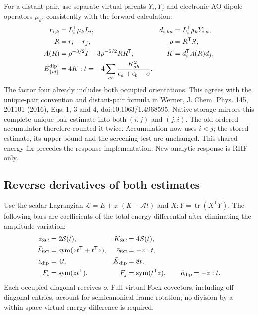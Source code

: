 \documentclass[11pt]{article}
\begin{document}
For a distant pair, use separate virtual parents $Y_i,Y_j$ and electronic
AO dipole operators $\mu_k$, consistently with the forward calculation:
\begin{align}
 r_{i,k}&=L_i^{\mathsf T}\mu_k L_i,&
 d_{i,ka}&=L_i^{\mathsf T}\mu_k Y_{i,a},\\
 R&=r_i-r_j,& \rho&=R^{\mathsf T}R,\\
 A(R)&=\rho^{-3/2}I-3\rho^{-5/2}RR^{\mathsf T},&
 K&=d_i^{\mathsf T}A(R)d_j,\\
 E_{\{ij\}}^{\rm dip}&=4K:t
 =-4\sum_{ab}\frac{K_{ab}^2}{\epsilon_a+\epsilon_b-o}.&&
 \label{eq:unique-dipole-energy}
\end{align}
The factor four already includes both occupied orientations. This agrees
with the unique-pair convention and distant-pair formula in Werner,
J. Chem. Phys. 145, 201101 (2016), Eqs. 1, 3 and 4,
doi:10.1063/1.4968595. Native storage mirrors this complete unique-pair
estimate into both $(i,j)$ and $(j,i)$. The old ordered accumulator therefore
counted it twice. Accumulation now uses $i<j$; the stored estimate, its
upper bound and the screening test are unchanged. This shared energy fix
precedes the response implementation. New analytic response is RHF only.

\subsection{Reverse derivatives of both estimates}
Use the scalar Lagrangian $\mathcal L=E+z:(K-\mathcal A t)$ and
$X:Y=\operatorname{tr}(X^{\mathsf T}Y)$. The following bars are coefficients
of the total energy differential after eliminating the amplitude variation:
\begin{align}
 z_{\rm SC}&=2\mathcal S(t),&\bar K_{\rm SC}&=4\mathcal S(t),\\
 \bar F_{\rm SC}&=\operatorname{sym}(zt^{\mathsf T}+t^{\mathsf T}z),&
 \bar o_{\rm SC}&=-z:t,\\
 z_{\rm dip}&=4t,&\bar K_{\rm dip}&=8t,\\
 \bar F_i&=\operatorname{sym}(zt^{\mathsf T}),&
 \bar F_j&=\operatorname{sym}(t^{\mathsf T}z),\qquad \bar o_{\rm dip}=-z:t.
 \label{eq:screened-bars}
\end{align}
Each occupied diagonal receives $\bar o$. Full virtual Fock covectors,
including off-diagonal entries, account for semicanonical frame rotation;
no division by a within-space virtual energy difference is required.
\end{document}

